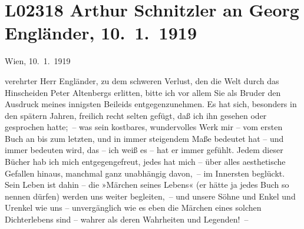 

\section[Arthur Schnitzler an Georg Engländer, 10. 1. 1919]{L02318 Arthur Schnitzler an Georg Engländer, 10. 1. 1919}
\nopagebreak{}
\rehead{ }\normalsize\beginnumbering{}
\toendnotes[C]{\smallbreak\pagebreak[2]}
\toendnotes[C]{\smallbreak}
\toendnotes[C]{\smallbreak}
\pstart
           \raggedleft{}{\pb}Wien, 10. 1. 1919\pend
           
\pstart{}verehrter Herr Engländer,\pend\vspace{0.5em}
\pstart
           zu dem schweren Verlust, den die Welt durch das Hinscheiden Peter Altenbergs erlitten, bitte ich vor allem Sie als Bruder
               den Ausdruck meines innigsten Beileids entgegenzunehmen. Es hat sich, besonders in
               den spätern Jahren, freilich recht selten gefügt, daß ich ihn gesehen oder gesprochen
               hatte; – was sein kostbares, wundervolles Werk mir – vom ersten Buch an bis zum letzten, und in immer steigendem Maße bedeutet hat – und
               immer bedeuten wird, das – ich weiß es – hat er immer gefühlt. Jedem dieser Bücher
               hab ich mich entgegengefreut, jedes hat mich – über alles aesthetische Gefallen
               hinaus, manchmal ganz unabhängig davon, – im Innersten beglückt. Sein Leben ist dahin
               – die »Märchen seines Lebens«
               (er hätte ja jedes Buch so nennen dürfen) werden uns weiter begleiten, – und unsere
               Söhne und Enkel und Urenkel wie uns – unvergänglich wie es eben die Märchen eines
               solchen Dichterlebens sind – wahrer als deren Wahrheiten und Legenden! –\pend
           
